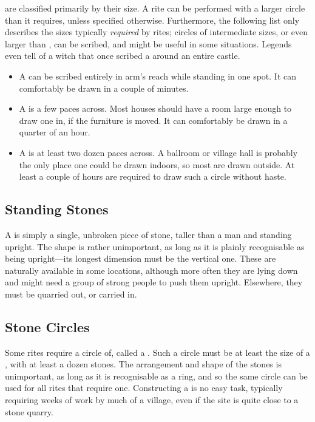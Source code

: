  are classified primarily by their size.
A rite can be performed with a larger circle than it requires, unless specified otherwise.
Furthermore, the following list only describes the sizes typically \emph{required} by rites; circles of intermediate sizes, or even larger than , can be scribed, and might be useful in some situations.
Legends even tell of a witch that once scribed a  around an entire castle.
\begin{itemize}
	\item A  can be scribed entirely in arm's reach while standing in one spot.
		It can comfortably be drawn in a couple of minutes.
	\item A  is a few paces across.
		Most houses should have a room large enough to draw one in, if the furniture is moved.
		It can comfortably be drawn in a quarter of an hour.
	\item A  is at least two dozen paces across.
		A ballroom or village hall is probably the only place one could be drawn indoors, so most are drawn outside.
		At least a couple of hours are required to draw such a circle without haste.
\end{itemize}

\subsection{Standing Stones}

A  is simply a single, unbroken piece of stone, taller than a man and standing upright.
The shape is rather unimportant, as long as it is plainly recognisable as being upright---its longest dimension must be the vertical one.
These are naturally available in some locations, although more often they are lying down and might need a group of strong people to push them upright.
Elsewhere, they must be quarried out, or carried in.

\subsection{Stone Circles}

Some rites require a circle of, called a .
Such a circle must be at least the size of a , with at least a dozen stones.
The arrangement and shape of the stones is unimportant, as long as it is recognisable as a ring, and so the same circle can be used for all rites that require one.
Constructing a  is no easy task, typically requiring weeks of work by much of a village, even if the site is quite close to a stone quarry.

